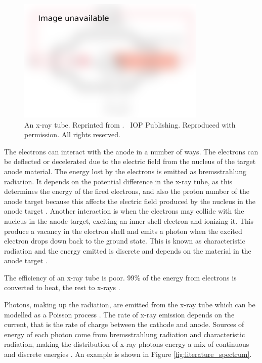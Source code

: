 \begin{figure}
  \centering
  \includegraphics[width=0.8\textwidth]{../figures/literatureReview/literature_tube.png}
  \caption{An x-ray tube. Reprinted from \cite{michael2001x}. \textcopyright\ IOP Publishing. Reproduced with permission. All rights reserved.}
  \label{fig:literature_tube}
\end{figure}

The electrons can interact with the anode in a number of ways. The electrons can be deflected or decelerated due to the electric field from the nucleus of the target anode material. The energy lost by the electrons is emitted as bremsstrahlung radiation. It depends on the potential difference in the x-ray tube, as this determines the energy of the fired electrons, and also the proton number of the anode target because this affects the electric field produced by the nucleus in the anode target \citep{sun2012overview}. Another interaction is when the electrons may collide with the nucleus in the anode target, exciting an inner shell electron and ionizing it. This produce a vacancy in the electron shell and emits a photon when the excited electron drops down back to the ground state. This is known as characteristic radiation and the energy emitted is discrete and depends on the material in the anode target \citep{sun2012overview}.

The efficiency of an x-ray tube is poor. 99\% of the energy from electrons is converted to heat, the rest to x-rays \citep{kruth2011computed}.

Photons, making up the radiation, are emitted from the x-ray tube which can be modelled as a Poisson process \citep{whiting2006properties, cierniak2011x}. The rate of x-ray emission depends on the current, that is the rate of charge between the cathode and anode. Sources of energy of each photon come from bremsstrahlung radiation and characteristic radiation, making the distribution of x-ray photons energy a mix of continuous and discrete energies \citep{sun2012overview}. An example is shown in Figure \ref{fig:literature_spectrum}.

